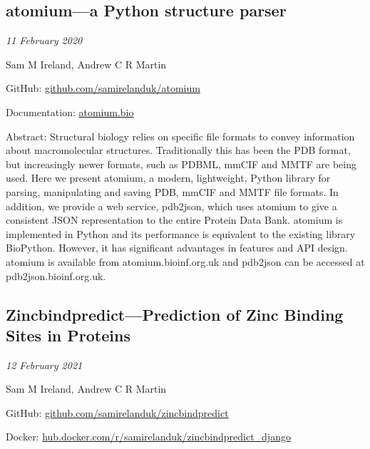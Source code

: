 \subsection{atomium—a Python structure parser}

\emph{11 February 2020}

Sam M Ireland, Andrew C R Martin

GitHub: \url{github.com/samirelanduk/atomium}

Documentation: \url{atomium.bio}

Abstract: Structural biology relies on specific file formats to convey information about macromolecular structures. Traditionally this has been the PDB format, but increasingly newer formats, such as PDBML, mmCIF and MMTF are being used. Here we present atomium, a modern, lightweight, Python library for parsing, manipulating and saving PDB, mmCIF and MMTF file formats. In addition, we provide a web service, pdb2json, which uses atomium to give a consistent JSON representation to the entire Protein Data Bank. atomium is implemented in Python and its performance is equivalent to the existing library BioPython. However, it has significant advantages in features and API design. atomium is available from atomium.bioinf.org.uk and pdb2json can be accessed at pdb2json.bioinf.org.uk.


\subsection{Zincbindpredict—Prediction of Zinc Binding Sites in Proteins}

\emph{12 February 2021}

Sam M Ireland, Andrew C R Martin

GitHub: \url{github.com/samirelanduk/zincbindpredict}

Docker: \url{hub.docker.com/r/samirelanduk/zincbindpredict_django}

